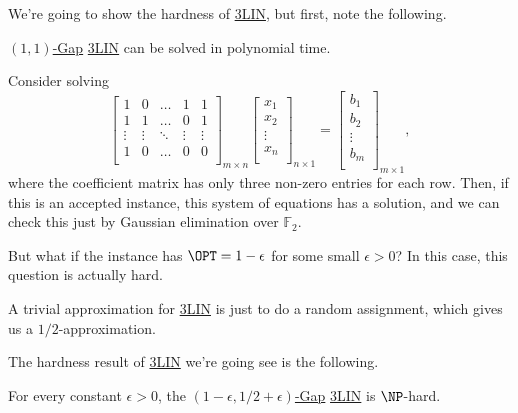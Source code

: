 We're going to show the hardness of \hyperref[prb:max-3LIN]{3LIN}, but first, note the following.
\begin{claim}
	\hyperref[def:c-s-Gap]{\((1, 1)\)-Gap} \hyperref[prb:max-3LIN]{3LIN} can be solved in polynomial time.
\end{claim}
\begin{explanation}
	Consider solving
	\[
		\begin{bmatrix}
			1      & 0      & \ldots & 1      & 1      \\
			1      & 1      & \ldots & 0      & 1      \\
			\vdots & \vdots & \ddots & \vdots & \vdots \\
			1      & 0      & \ldots & 0      & 0      \\
		\end{bmatrix}_{m\times n} \begin{bmatrix}
			x_1    \\
			x_2    \\
			\vdots \\
			x_n    \\
		\end{bmatrix}_{n\times 1} = \begin{bmatrix}
			b_1    \\
			b_2    \\
			\vdots \\
			b_m    \\
		\end{bmatrix}_{m\times 1},
	\]
	where the coefficient matrix has only three non-zero entries for each row. Then, if this is an accepted instance, this system of equations has a solution, and we can check this just by Gaussian elimination over \(\mathbb{F} _2\).
\end{explanation}

But what if the instance has \(\OPT = 1 - \epsilon \) for some small \(\epsilon > 0\)? In this case, this question is actually hard.

\begin{remark}
	A trivial approximation for \hyperref[prb:max-3LIN]{3LIN} is just to do a random assignment, which gives us a \(1 / 2\)-approximation.
\end{remark}

The hardness result of \hyperref[prb:max-3LIN]{3LIN} we're going see is the following.

\begin{theorem}[\cite{10.1145/258533.258536}]\label{thm:3LIN}
	For every constant \(\epsilon >0\), the \hyperref[def:c-s-Gap]{\((1 - \epsilon , 1 / 2 + \epsilon )\)-Gap} \hyperref[prb:max-3LIN]{3LIN} is \(\NP\)-hard.
\end{theorem}


